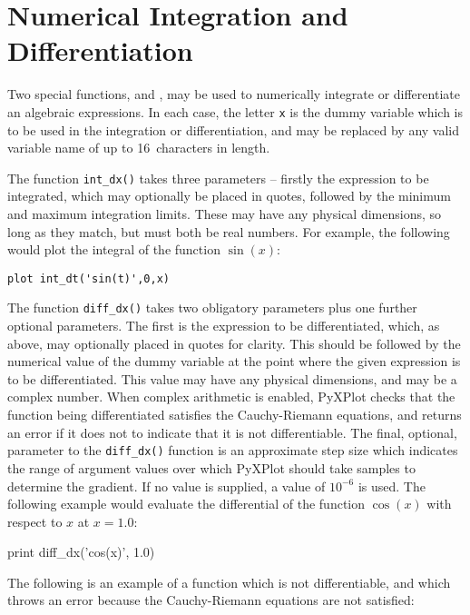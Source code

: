 \section{Numerical Integration and Differentiation}

 Two special functions,
 and , may be used to numerically
integrate or differentiate an algebraic expressions.  In each case, the letter
{\tt x} is the dummy variable which is to be used in the integration or
differentiation, and may be replaced by any valid variable name of up to
16~characters in length.

The function {\tt int\_dx()} takes three parameters -- firstly the expression
to be integrated, which may optionally be placed in quotes, followed by the
minimum and maximum integration limits. These may have any physical dimensions,
so long as they match, but must both be real numbers. For example, the
following would plot the integral of the function $\sin(x)$:

\begin{verbatim}
plot int_dt('sin(t)',0,x)
\end{verbatim} 

The function {\tt diff\_dx()} takes two obligatory parameters plus one further
optional parameters. The first is the expression to be differentiated, which,
as above, may optionally placed in quotes for clarity. This should be followed
by the numerical value of the dummy variable at the point where the given
expression is to be differentiated. This value may have any physical
dimensions, and may be a complex number. When complex arithmetic is enabled,
PyXPlot checks that the function being differentiated satisfies the
Cauchy-Riemann equations, and returns an error if it does not to indicate that it
is not differentiable.  The final, optional, parameter to the {\tt diff\_dx()}
function is an approximate step size which indicates the range of argument
values over which PyXPlot should take samples to determine the gradient. If no
value is supplied, a value of $10^{-6}$ is used.  The following example would
evaluate the differential of the function $\cos(x)$ with respect to $x$ at
$x=1.0$:

\begin{dodo}
print diff\_dx('cos(x)', 1.0)
\end{dodo}

The following is an example of a function which is not differentiable, and
which throws an error because the Cauchy-Riemann equations are not satisfied:

